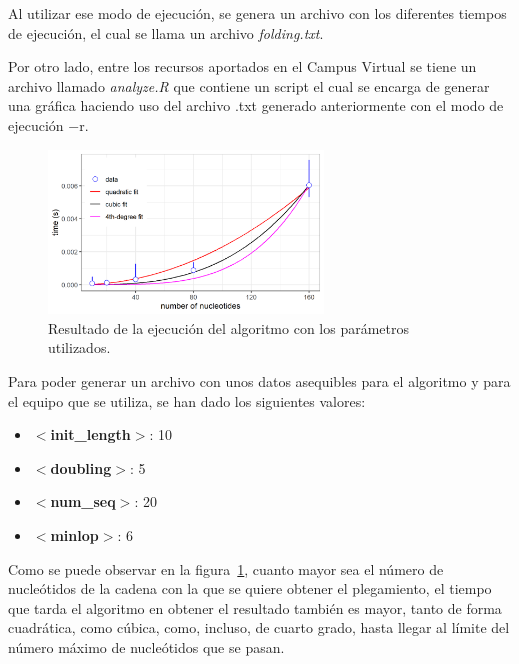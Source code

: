 \documentclass[11pt,letterpaper]{article}
\begin{document}
Al utilizar ese modo de ejecución, se genera un archivo con los diferentes tiempos de ejecución, el cual se llama  un archivo \textit{folding.txt}.

Por otro lado, entre los recursos aportados en el Campus Virtual se tiene un archivo llamado \textit{analyze.R} que contiene un script el cual se encarga de generar una gráfica haciendo uso del archivo .txt generado anteriormente con el modo de ejecución $-$r.

\begin{figure}[H]
	\centering
	\includegraphics[width=0.65\textwidth]{folding.png}
	\caption{Resultado de la ejecución del algoritmo con los parámetros utilizados.}
	\label{fig:grafico}
\end{figure}

Para poder generar un archivo con unos datos asequibles para el algoritmo y para el equipo que se utiliza, se han dado los siguientes valores: 

\begin{multicols}{2}
	\begin{itemize}
		\item \textbf{$<$init\_length$>$}: 10
		\item \textbf{$<$doubling$>$}: 5
		\item \textbf{$<$num\_seq$>$}: 20
		\item \textbf{$<$minlop$>$}: 6
	\end{itemize}
\end{multicols}

Como se puede observar en la figura~\ref{fig:grafico}, cuanto mayor sea el número de nucleótidos de la cadena con la que se quiere obtener el plegamiento, el tiempo que tarda el algoritmo en obtener el resultado también es mayor, tanto de forma cuadrática, como cúbica, como, incluso, de cuarto grado, hasta llegar al límite del número máximo de nucleótidos que se pasan.
\end{document}
